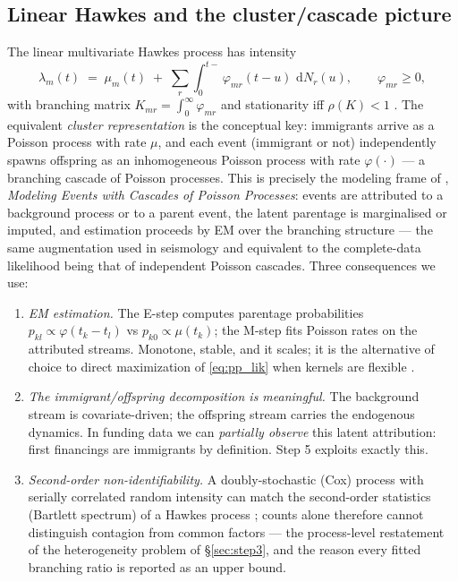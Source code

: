 \documentclass[11pt]{article}
\newcommand{\dd}{\,\mathrm{d}}
\numberwithin{assumption}{section}
\numberwithin{proposition}{section}
\numberwithin{remark}{section}
\begin{document}
\subsection{Linear Hawkes and the cluster/cascade picture}
The linear multivariate Hawkes process \citep{hawkes1971} has intensity
\begin{equation}
\lambda_m(t)\;=\;\mu_m(t)\;+\;\sum_{r}\int_0^{t-}
\varphi_{mr}(t-u)\,\dd N_r(u),
\qquad \varphi_{mr}\ge0 ,
\label{eq:hawkes}
\end{equation}
with branching matrix $K_{mr}=\int_0^\infty\varphi_{mr}$ and stationarity
iff $\rho(K)<1$ \citep{hawkes1971,bremaud1996}. The equivalent
\emph{cluster representation} \citep{hawkesoakes1974} is the conceptual
key: immigrants arrive as a Poisson process with rate $\mu$, and each event
(immigrant or not) independently spawns offspring as an inhomogeneous
Poisson process with rate $\varphi(\cdot)$ --- a branching cascade of
Poisson processes. This is precisely the modeling frame of
\citet{simmajordan2010}, \emph{Modeling Events with Cascades of Poisson
Processes}: events are attributed to a background process or to a parent
event, the latent parentage is marginalised or imputed, and estimation
proceeds by EM over the branching structure --- the same augmentation used
in seismology \citep{veen2008} and equivalent to the complete-data
likelihood being that of independent Poisson cascades. Three consequences
we use:
\begin{enumerate}[leftmargin=1.6em]
\item \emph{EM estimation.} The E-step computes parentage probabilities
$p_{kl}\propto\varphi(t_k-t_l)$ vs $p_{k0}\propto\mu(t_k)$; the M-step
fits Poisson rates on the attributed streams. Monotone, stable, and it
scales; it is the alternative of choice to direct maximization of
\eqref{eq:pp_lik} \citep{ogata1978,ozaki1979} when kernels are flexible
\citep{lewis2011}.
\item \emph{The immigrant/offspring decomposition is meaningful.} The
background stream is covariate-driven; the offspring stream carries the
endogenous dynamics. In funding data we can \emph{partially observe} this
latent attribution: first financings are immigrants by definition. Step 5
exploits exactly this.
\item \emph{Second-order non-identifiability.} A doubly-stochastic
(Cox) process with serially correlated random intensity can match the
second-order statistics (Bartlett spectrum) of a Hawkes process
\citep{daleyvj2003}; counts alone therefore cannot distinguish contagion
from common factors --- the process-level restatement of the
heterogeneity problem of \S\ref{sec:step3}, and the reason every fitted
branching ratio is reported as an upper bound.
\end{enumerate}
\end{document}
